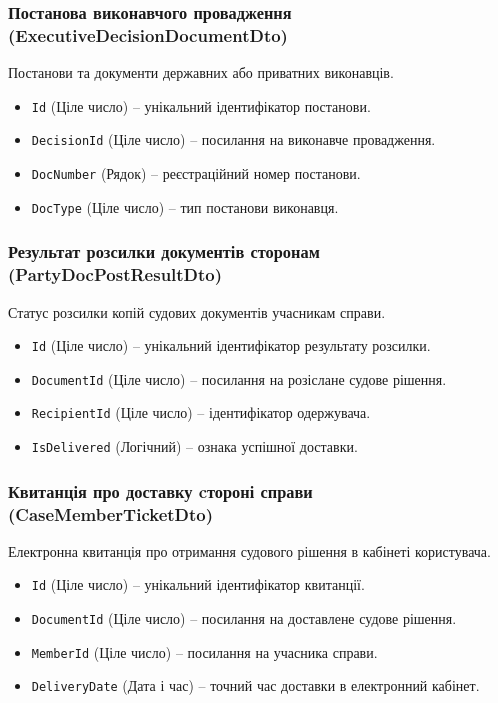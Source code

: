 \documentclass{article}
\begin{document}
\subsubsection{Постанова виконавчого провадження (ExecutiveDecisionDocumentDto)}
Постанови та документи державних або приватних виконавців.
\begin{itemize}
    \item \texttt{Id} (Ціле число) -- унікальний ідентифікатор постанови.
    \item \texttt{DecisionId} (Ціле число) -- посилання на виконавче провадження.
    \item \texttt{DocNumber} (Рядок) -- реєстраційний номер постанови.
    \item \texttt{DocType} (Ціле число) -- тип постанови виконавця.
\end{itemize}

\subsubsection{Результат розсилки документів сторонам (PartyDocPostResultDto)}
Статус розсилки копій судових документів учасникам справи.
\begin{itemize}
    \item \texttt{Id} (Ціле число) -- унікальний ідентифікатор результату розсилки.
    \item \texttt{DocumentId} (Ціле число) -- посилання на розіслане судове рішення.
    \item \texttt{RecipientId} (Ціле число) -- ідентифікатор одержувача.
    \item \texttt{IsDelivered} (Логічний) -- ознака успішної доставки.
\end{itemize}

\subsubsection{Квитанція про доставку cтороні справи (CaseMemberTicketDto)}
Електронна квитанція про отримання судового рішення в кабінеті користувача.
\begin{itemize}
    \item \texttt{Id} (Ціле число) -- унікальний ідентифікатор квитанції.
    \item \texttt{DocumentId} (Ціле число) -- посилання на доставлене судове рішення.
    \item \texttt{MemberId} (Ціле число) -- посилання на учасника справи.
    \item \texttt{DeliveryDate} (Дата і час) -- точний час доставки в електронний кабінет.
\end{itemize}
\end{document}

